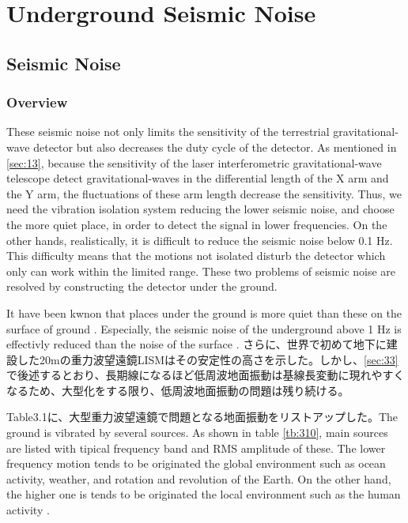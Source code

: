 \chapter{Underground Seismic Noise}

\section{Seismic Noise}
\subsection{Overview}
These seismic noise not only limits the sensitivity of the terrestrial gravitational-wave detector but also decreases the duty cycle of the detector. As mentioned in \cref{sec:13}, because the sensitivity of the laser interferometric gravitational-wave telescope detect gravitational-waves in the differential length of the X arm and the Y arm, the fluctuations of these arm length decrease the sensitivity. Thus, we need the vibration isolation system reducing the lower seismic noise, and choose the more quiet place, in order to detect the signal in lower frequencies. On the other hands, realistically, it is difficult to reduce the seismic noise below 0.1 $\mathrm{Hz}$. This difficulty means that the motions not isolated disturb the detector which only can work within the limited range. These two problems of seismic noise are resolved by constructing the detector under the ground.

It have been kwnon that places under the ground is more quiet than these on the surface of ground \cite{carter1991high}. Especially, the seismic noise of the underground above 1 $\mathrm{Hz}$ is effectivly reduced than the noise of the surface \cite{lcgt2009lcgt}. さらに、世界で初めて地下に建設した20mの重力波望遠鏡LISMはその安定性の高さを示した\cite{sato2004ultrastable}。しかし、\cref{sec:33}で後述するとおり、長期線になるほど低周波地面振動は基線長変動に現れやすくなるため、大型化をする限り、低周波地面振動の問題は残り続ける。


Table3.1に、大型重力波望遠鏡で問題となる地面振動をリストアップした。The ground is vibrated by several sources. As shown in table \ref{tb:310}, main sources are listed with tipical frequency band and RMS amplitude of these. The lower frequency motion tends to be originated the global environment such as ocean activity, weather, and rotation and revolution of the Earth. On the other hand, the higher one is tends to be originated the local environment such as the human activity .

